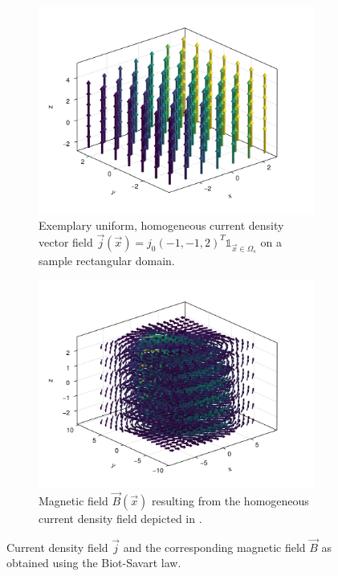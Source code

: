 \documentclass[10pt]{article}
\begin{document}
  \begin{figure}[H]
    \centering
    \begin{subfigure}[t]{0.48\textwidth}
      \centering
      \includegraphics[width=\textwidth]{../figures/homo-cdp-j-field.pdf}
      \caption{Exemplary uniform, homogeneous current density vector field $\vec{j}(\vec{x}) = {j}_0 (-1, -1, 2)^T \mathds{1}_{\vec{x} \in \Omega_s}$ on a sample rectangular domain.}
      \label{fig:demo-cdp-j-field}
    \end{subfigure}
    \hfill
    \begin{subfigure}[t]{0.48\textwidth}
      \centering
      \includegraphics[width=\textwidth]{../figures/homo-cdp-b-field.pdf}
      \caption{Magnetic field $\vec{B}(\vec{x})$ resulting from the homogeneous current density field depicted in .}
      \label{fig:demo-cdp-b-field}
    \end{subfigure}
    \caption{Current density field $\vec{j}$ and the corresponding magnetic field $\vec{B}$ as obtained using the Biot-Savart law.}
  \end{figure}
\end{document}
